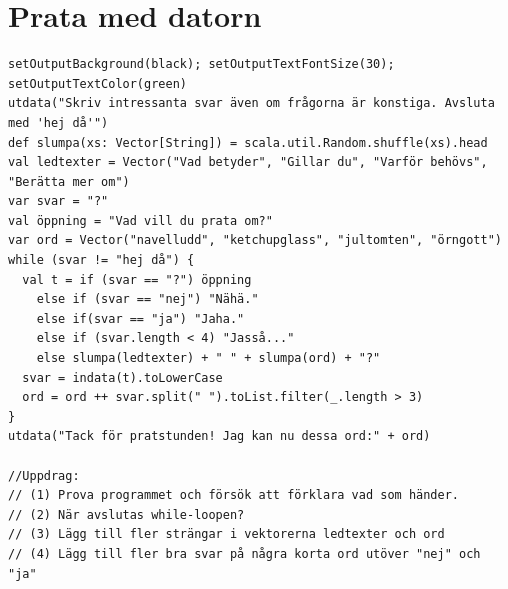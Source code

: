 \chapter{Prata med datorn}
\begin{lstlisting}[basicstyle={\ttfamily\fontsize{13}{16}\selectfont},numbers=none]
setOutputBackground(black); setOutputTextFontSize(30); setOutputTextColor(green)
utdata("Skriv intressanta svar även om frågorna är konstiga. Avsluta med 'hej då'")
def slumpa(xs: Vector[String]) = scala.util.Random.shuffle(xs).head
val ledtexter = Vector("Vad betyder", "Gillar du", "Varför behövs", "Berätta mer om")
var svar = "?"
val öppning = "Vad vill du prata om?"
var ord = Vector("navelludd", "ketchupglass", "jultomten", "örngott") 
while (svar != "hej då") {
  val t = if (svar == "?") öppning 
    else if (svar == "nej") "Nähä." 
    else if(svar == "ja") "Jaha." 
    else if (svar.length < 4) "Jasså..." 
    else slumpa(ledtexter) + " " + slumpa(ord) + "?"
  svar = indata(t).toLowerCase
  ord = ord ++ svar.split(" ").toList.filter(_.length > 3) 
} 
utdata("Tack för pratstunden! Jag kan nu dessa ord:" + ord)

//Uppdrag:
// (1) Prova programmet och försök att förklara vad som händer.
// (2) När avslutas while-loopen?
// (3) Lägg till fler strängar i vektorerna ledtexter och ord
// (4) Lägg till fler bra svar på några korta ord utöver "nej" och "ja"
\end{lstlisting}
        
